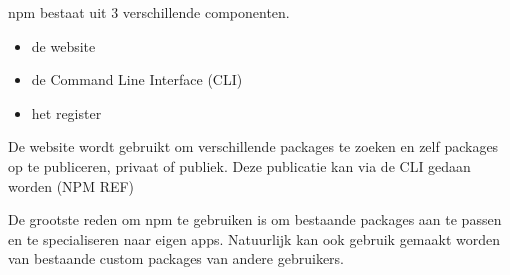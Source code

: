npm bestaat uit 3 verschillende componenten.
\begin{itemize}
	\item de website
	\item de Command Line Interface (CLI)
	\item het register
\end{itemize}

De website wordt gebruikt om verschillende packages te zoeken en zelf packages op te publiceren, privaat of publiek. Deze publicatie kan via de CLI gedaan worden
(NPM REF)

De grootste reden om npm te gebruiken is om bestaande packages aan te passen en te specialiseren naar eigen apps. Natuurlijk kan ook gebruik gemaakt worden van bestaande custom packages van andere gebruikers.
 